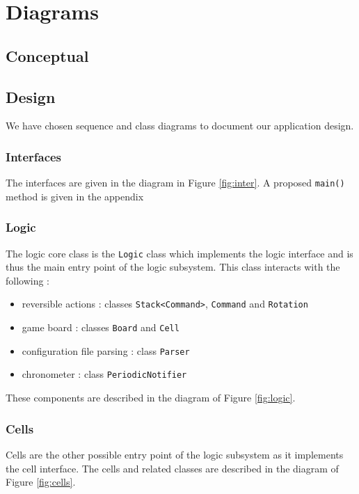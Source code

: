 \documentclass[a4paper,11pt]{article}
\begin{document}
\section{Diagrams}
\label{sec:diagrams}
\subsection{Conceptual}
\subsection{Design}
We have chosen sequence and class diagrams to document our application design. 
\subsubsection{Interfaces}
The interfaces are given in the diagram in Figure \ref{fig:inter}. A proposed \texttt{main()} method is given in the appendix 
\subsubsection{Logic}
The logic core class is the \texttt{Logic} class which implements the logic interface and is thus the main entry point of the logic subsystem. This class interacts with the following :
\begin{itemize}
	\item reversible actions : classes \texttt{Stack<Command>}, \texttt{Command} and \texttt{Rotation} 
	\item game board : classes \texttt{Board} and \texttt{Cell}
	\item configuration file parsing : class \texttt{Parser}
	\item chronometer : class \texttt{PeriodicNotifier}
\end{itemize}
These components are described in the diagram of Figure \ref{fig:logic}.
\subsubsection{Cells}
Cells are the other possible entry point of the logic subsystem as it implements the cell interface. The cells and related classes are described in the diagram of Figure \ref{fig:cells}.
\end{document}
